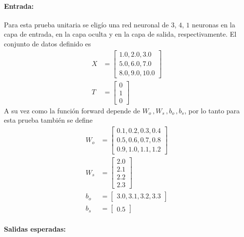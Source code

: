\documentclass[11pt,a4paper]{article}
\begin{document}
\paragraph{Entrada:} Para esta prueba unitaria se eligío una red neuronal de $3$, $4$, $1$ neuronas en la capa de entrada, en la capa oculta y en la capa de salida, respectivamente. El conjunto de datos definido es
\begin{align}
  X &= 
  \begin{bmatrix} 
      1.0, 2.0, 3.0 \\
      5.0, 6.0, 7.0 \\
      8.0, 9.0, 10.0
  \end{bmatrix} \\
  T &= 
  \begin{bmatrix}
    0 \\
    1 \\
    0
  \end{bmatrix}  
\end{align}
A su vez como la función forward depende de $W_o \,, W_s \,, b_o \,, b_s$, por lo tanto para esta prueba también se define
\begin{align}
  W_o &= 
  \begin{bmatrix}
    0.1, 0.2, 0.3, 0.4 \\
    0.5, 0.6, 0.7, 0.8 \\
    0.9, 1.0, 1.1, 1.2
  \end{bmatrix} \\
  W_s &=
  \begin{bmatrix}
    2.0 \\
    2.1 \\
    2.2 \\
    2.3    
  \end{bmatrix} \\
  b_o &= 
  \begin{bmatrix}
    3.0, 3.1, 3.2, 3.3
  \end{bmatrix} \\
  b_s &= 
  \begin{bmatrix}
    0.5
  \end{bmatrix}
\end{align} 

\paragraph{Salidas esperadas:}
\end{document}
